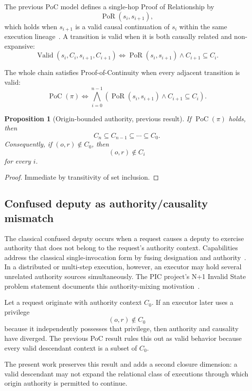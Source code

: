 \documentclass[10pt,twocolumn]{article}
\newcommand{\PoR}{\operatorname{PoR}}
\newcommand{\PoC}{\operatorname{PoC}}
\newtheorem{proposition}{Proposition}
\begin{document}
The previous PoC model defines a single-hop Proof of Relationship by
\[
\PoR(s_i,s_{i+1}),
\]
which holds when \(s_{i+1}\) is a valid causal continuation of \(s_i\) within
the same execution lineage~\cite{gallo2026poc}. A transition is valid when it
is both causally related and non-expansive:
\[
\operatorname{Valid}(s_i,C_i,s_{i+1},C_{i+1})
\Longleftrightarrow
\PoR(s_i,s_{i+1})
\land
C_{i+1}\subseteq C_i.
\]

The whole chain satisfies Proof-of-Continuity when every adjacent transition is
valid:
\[
\PoC(\pi)
\Longleftrightarrow
\bigwedge_{i=0}^{n-1}
\left(
\PoR(s_i,s_{i+1})
\land
C_{i+1}\subseteq C_i
\right).
\]

\begin{proposition}[Origin-bounded authority, previous result]
If \(\PoC(\pi)\) holds, then
\[
C_n\subseteq C_{n-1}\subseteq\cdots\subseteq C_0.
\]
Consequently, if \((o,r)\notin C_0\), then
\[
(o,r)\notin C_i
\]
for every \(i\).
\end{proposition}

\begin{proof}
Immediate by transitivity of set inclusion.
\end{proof}

\subsection{Confused deputy as authority/causality mismatch}

The classical confused deputy occurs when a request causes a deputy to exercise
authority that does not belong to the request's authority context. Capabilities
address the classical single-invocation form by fusing designation and
authority~\cite{hardy1988confused,miller2003capability}. In a distributed or
multi-step execution, however, an executor may hold several unrelated authority
sources simultaneously. The PIC project's N+1 Invalid State problem statement
documents this authority-mixing motivation~\cite{picAuthorityMixing}.

Let a request originate with authority context \(C_0\). If an executor later
uses a privilege
\[
(o,r)\notin C_0
\]
because it independently possesses that privilege, then authority and causality
have diverged. The previous PoC result rules this out as valid behavior because
every valid descendant context is a subset of \(C_0\).

The present work preserves this result and adds a second closure dimension: a
valid descendant may not expand the relational class of executions through
which origin authority is permitted to continue.
\end{document}
